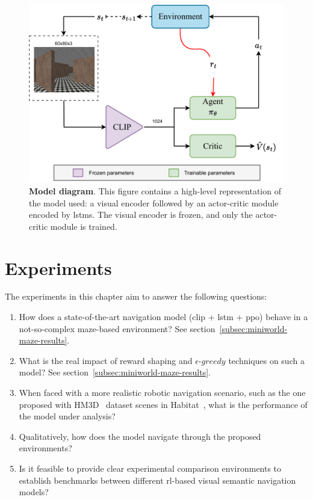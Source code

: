 \begin{figure}
    \centering
    \includegraphics[width=\linewidth]{figures/understanding_vsn/network_clip_diagram}
    \caption{\textbf{Model diagram}. This figure contains a high-level representation of the model used: a visual encoder followed by an actor-critic module encoded by \acrshort{lstm}s. The visual encoder is frozen, and only the actor-critic module is trained.}
    \label{fig:network_clip_diagram}
\end{figure}


\section{Experiments}
\label{sec:experiments-vsn-understanding}

The experiments in this chapter aim to answer the following questions:
\begin{enumerate}
    \item How does a state-of-the-art navigation model (\acrshort{clip} + \acrshort{lstm} + \acrshort{ppo}) behave in a not-so-complex maze-based environment?
    See section~\ref{subsec:miniworld-maze-results}.
    \item What is the real impact of reward shaping and $\epsilon\text{-}greedy$ techniques on such a model?
    See section~\ref{subsec:miniworld-maze-results}.
    \item When faced with a more realistic robotic navigation scenario, such as the one proposed with HM3D~\cite{ramakrishnan2021} dataset scenes in Habitat~\cite{szot2021}, what is the performance of the model under analysis?
    \item Qualitatively, how does the model navigate through the proposed environments?
    \item Is it feasible to provide clear experimental comparison environments to establish benchmarks between different \acrshort{rl}-based visual semantic navigation models?
\end{enumerate}

